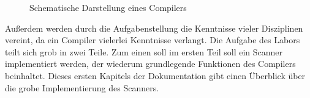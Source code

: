 \documentclass[a4paper,11pt]{report}
\begin{document}
\begin{figure}
\centering
{}
\caption{Schematische Darstellung eines Compilers}
\label{fig:compiler}
\end{figure}

Außerdem werden durch die Aufgabenstellung die Kenntnisse vieler Disziplinen vereint, da ein Compiler vielerlei Kenntnisse verlangt.
Die Aufgabe des Labors teilt sich grob in zwei Teile.
Zum einen soll im ersten Teil soll ein Scanner implementiert werden, der wiederum grundlegende Funktionen des Compilers beinhaltet.
Dieses ersten Kapitels der Dokumentation gibt einen Überblick über die grobe Implementierung des Scanners.
\end{document}
